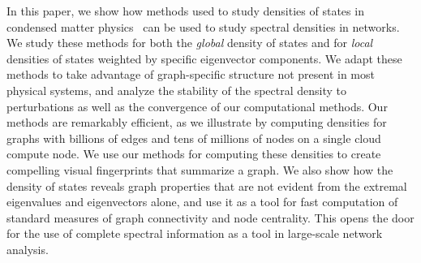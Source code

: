 In this paper, we show how methods used to study densities of states in
condensed matter physics~\cite{weisse2006kernel} can be used to study spectral
densities in networks.  We study these methods for both the {\em global} density
of states and for {\em local} densities of states weighted by specific
eigenvector components. We adapt these methods to take advantage of
graph-specific structure not present in most physical systems, and analyze the
stability of the spectral density to perturbations as well as the convergence of
our computational methods.  Our methods are remarkably efficient, as we
illustrate by computing densities for graphs with billions of edges and tens of
millions of nodes on a single cloud compute node. We use our methods for
computing these densities to create compelling visual fingerprints that
summarize a graph. We also show how the density of states reveals graph
properties that are not evident from the extremal eigenvalues and eigenvectors
alone, and use it as a tool for fast computation of standard measures of graph
connectivity and node centrality. This opens the door for the use of complete
spectral information as a tool in large-scale network analysis.